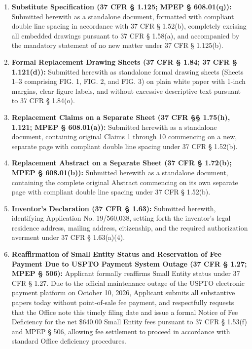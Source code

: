 \documentclass[11pt,letterpaper]{article}
\begin{document}
\begin{enumerate}[leftmargin=2em, itemsep=3pt, parsep=0pt]
    \item \textbf{Substitute Specification (37 CFR \S{} 1.125; MPEP \S{} 608.01(q)):} Submitted herewith as a standalone document, formatted with compliant double line spacing in accordance with 37 CFR \S{} 1.52(b), completely excising all embedded drawings pursuant to 37 CFR \S{} 1.58(a), and accompanied by the mandatory statement of no new matter under 37 CFR \S{} 1.125(b).
    \item \textbf{Formal Replacement Drawing Sheets (37 CFR \S{} 1.84; 37 CFR \S{} 1.121(d)):} Submitted herewith as standalone formal drawing sheets (Sheets 1--3 comprising FIG. 1, FIG. 2, and FIG. 3) on plain white paper with 1-inch margins, clear figure labels, and without excessive descriptive text pursuant to 37 CFR \S{} 1.84(o).
    \item \textbf{Replacement Claims on a Separate Sheet (37 CFR \S\S{} 1.75(h), 1.121; MPEP \S{} 608.01(a)):} Submitted herewith as a standalone document, containing original Claims 1 through 10 commencing on a new, separate page with compliant double line spacing under 37 CFR \S{} 1.52(b).
    \item \textbf{Replacement Abstract on a Separate Sheet (37 CFR \S{} 1.72(b); MPEP \S{} 608.01(b)):} Submitted herewith as a standalone document, containing the complete original Abstract commencing on its own separate page with compliant double line spacing under 37 CFR \S{} 1.52(b).
    \item \textbf{Inventor's Declaration (37 CFR \S{} 1.63):} Submitted herewith, identifying Application No. 19/560,038, setting forth the inventor's legal residence address, mailing address, citizenship, and the required authorization averment under 37 CFR \S{} 1.63(a)(4).
    \item \textbf{Reaffirmation of Small Entity Status and Reservation of Fee Payment Due to USPTO Payment System Outage (37 CFR \S{} 1.27; MPEP \S{} 506):} Applicant formally reaffirms Small Entity status under 37 CFR \S{} 1.27. Due to the official maintenance outage of the USPTO electronic payment platform on October 10, 2026, Applicant submits all substantive papers today without point-of-sale fee payment, and respectfully requests that the Office note this timely filing date and issue a formal Notice of Fee Deficiency for the net \$640.00 Small Entity fees pursuant to 37 CFR \S{} 1.53(f) and MPEP \S{} 506, allowing fee settlement to proceed in accordance with standard Office deficiency procedures.

\end{enumerate}
\end{document}
